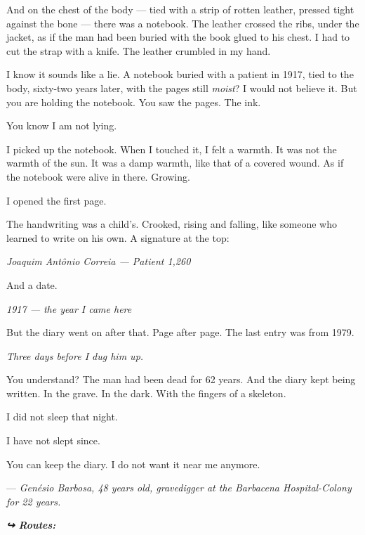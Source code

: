 \noindent And on the chest of the body --- tied with a strip of rotten leather, pressed tight against the bone --- there was a notebook. The leather crossed the ribs, under the jacket, as if the man had been buried with the book glued to his chest. I had to cut the strap with a knife. The leather crumbled in my hand.

\noindent I know it sounds like a lie. A notebook buried with a patient in 1917, tied to the body, sixty-two years later, with the pages still \textit{moist}? I would not believe it. But you are holding the notebook. You saw the pages. The ink.

\noindent You know I am not lying.

\noindent I picked up the notebook. When I touched it, I felt a warmth. It was not the warmth of the sun. It was a damp warmth, like that of a covered wound. As if the notebook were alive in there. Growing.

\noindent I opened the first page.

\noindent The handwriting was a child's. Crooked, rising and falling, like someone who learned to write on his own. A signature at the top:

\noindent \textit{Joaquim Antônio Correia --- Patient 1,260}

\noindent And a date.

\noindent \textit{1917 --- the year I came here}

\noindent But the diary went on after that. Page after page. The last entry was from 1979.

\noindent \textit{Three days before I dug him up.}

\noindent You understand? The man had been dead for 62 years. And the diary kept being written. In the grave. In the dark. With the fingers of a skeleton.

\noindent I did not sleep that night.

\noindent I have not slept since.

\noindent You can keep the diary. I do not want it near me anymore.

\noindent --- \textit{Genésio Barbosa, 48 years old, gravedigger at the Barbacena Hospital-Colony for 22 years.}

\vspace{0.5em}
\noindent\textit{\textbf{↪ Routes:}  \rotasep {}}
